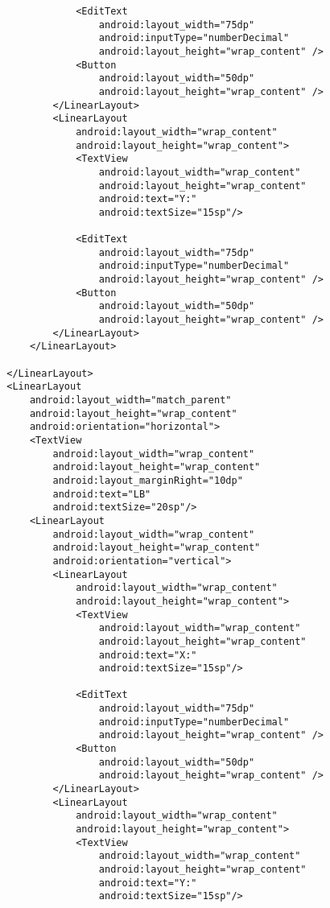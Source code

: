 \begin{lstlisting}
                    <EditText
                        android:layout_width="75dp"
                        android:inputType="numberDecimal"
                        android:layout_height="wrap_content" />
                    <Button
                        android:layout_width="50dp"
                        android:layout_height="wrap_content" />
                </LinearLayout>
                <LinearLayout
                    android:layout_width="wrap_content"
                    android:layout_height="wrap_content">
                    <TextView
                        android:layout_width="wrap_content"
                        android:layout_height="wrap_content"
                        android:text="Y:"
                        android:textSize="15sp"/>

                    <EditText
                        android:layout_width="75dp"
                        android:inputType="numberDecimal"
                        android:layout_height="wrap_content" />
                    <Button
                        android:layout_width="50dp"
                        android:layout_height="wrap_content" />
                </LinearLayout>
            </LinearLayout>

        </LinearLayout>
        <LinearLayout
            android:layout_width="match_parent"
            android:layout_height="wrap_content"
            android:orientation="horizontal">
            <TextView
                android:layout_width="wrap_content"
                android:layout_height="wrap_content"
                android:layout_marginRight="10dp"
                android:text="LB"
                android:textSize="20sp"/>
            <LinearLayout
                android:layout_width="wrap_content"
                android:layout_height="wrap_content"
                android:orientation="vertical">
                <LinearLayout
                    android:layout_width="wrap_content"
                    android:layout_height="wrap_content">
                    <TextView
                        android:layout_width="wrap_content"
                        android:layout_height="wrap_content"
                        android:text="X:"
                        android:textSize="15sp"/>

                    <EditText
                        android:layout_width="75dp"
                        android:inputType="numberDecimal"
                        android:layout_height="wrap_content" />
                    <Button
                        android:layout_width="50dp"
                        android:layout_height="wrap_content" />
                </LinearLayout>
                <LinearLayout
                    android:layout_width="wrap_content"
                    android:layout_height="wrap_content">
                    <TextView
                        android:layout_width="wrap_content"
                        android:layout_height="wrap_content"
                        android:text="Y:"
                        android:textSize="15sp"/>


\end{lstlisting}
